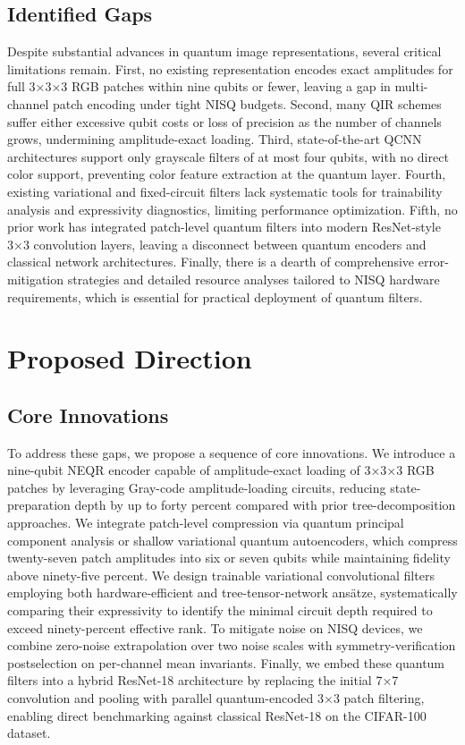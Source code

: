 \documentclass[onecolumn,12pt]{IEEEtran}
\begin{document}
\subsection{Identified Gaps}
Despite substantial advances in quantum image representations, several critical limitations remain. First, no existing representation encodes exact amplitudes for full 3×3×3 RGB patches within nine qubits or fewer, leaving a gap in multi-channel patch encoding under tight NISQ budgets. Second, many QIR schemes suffer either excessive qubit costs or loss of precision as the number of channels grows, undermining amplitude-exact loading. Third, state-of-the-art QCNN architectures support only grayscale filters of at most four qubits, with no direct color support, preventing color feature extraction at the quantum layer. Fourth, existing variational and fixed-circuit filters lack systematic tools for trainability analysis and expressivity diagnostics, limiting performance optimization. Fifth, no prior work has integrated patch-level quantum filters into modern ResNet-style 3×3 convolution layers, leaving a disconnect between quantum encoders and classical network architectures. Finally, there is a dearth of comprehensive error-mitigation strategies and detailed resource analyses tailored to NISQ hardware requirements, which is essential for practical deployment of quantum filters.

\section{Proposed Direction}
\subsection{Core Innovations}
To address these gaps, we propose a sequence of core innovations. We introduce a nine-qubit NEQR encoder capable of amplitude-exact loading of 3×3×3 RGB patches by leveraging Gray-code amplitude-loading circuits, reducing state-preparation depth by up to forty percent compared with prior tree-decomposition approaches. We integrate patch-level compression via quantum principal component analysis or shallow variational quantum autoencoders, which compress twenty-seven patch amplitudes into six or seven qubits while maintaining fidelity above ninety-five percent. We design trainable variational convolutional filters employing both hardware-efficient and tree-tensor-network ansätze, systematically comparing their expressivity to identify the minimal circuit depth required to exceed ninety-percent effective rank. To mitigate noise on NISQ devices, we combine zero-noise extrapolation over two noise scales with symmetry-verification postselection on per-channel mean invariants. Finally, we embed these quantum filters into a hybrid ResNet-18 architecture by replacing the initial 7×7 convolution and pooling with parallel quantum-encoded 3×3 patch filtering, enabling direct benchmarking against classical ResNet-18 on the CIFAR-100 dataset.
\end{document}
